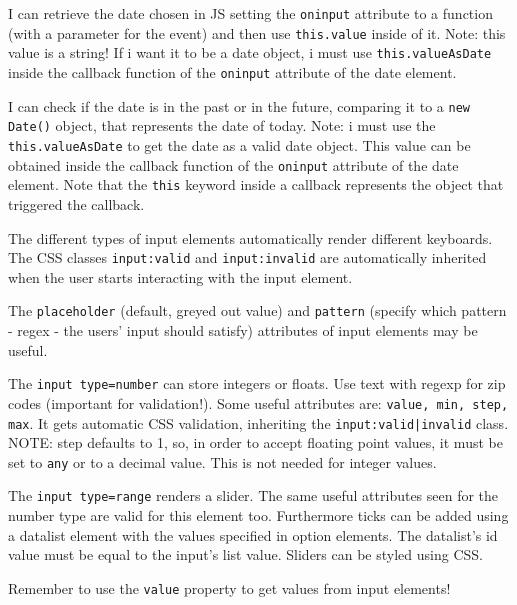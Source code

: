 \documentclass[a4paper,11pt]{book}
\begin{document}
I can retrieve the date chosen in JS setting the \texttt{oninput} attribute to a function
(with a parameter for the event) and then use \texttt{this.value} inside of it. Note:
this value is a string! If i want it to be a date object, i must use
\texttt{this.valueAsDate} inside the callback function of the \texttt{oninput}
attribute of the date element.

I can check if the date is in the past or in the future, comparing it to a
\texttt{new Date()} object, that represents the date of today. Note: i must
use the \texttt{this.valueAsDate} to get the date as a valid date object.
This value can be obtained inside the callback function of the
\texttt{oninput} attribute of the date element.
Note that the \texttt{this} keyword inside a callback represents the object
that triggered the callback.

The different types of input elements automatically render different keyboards.
The CSS classes \texttt{input:valid} and \texttt{input:invalid} are automatically
inherited when the user starts interacting with the input element.

The \texttt{placeholder} (default, greyed out value) and \texttt{pattern}
(specify which pattern - regex - the users' input should satisfy) attributes of
input elements may be useful.

The \texttt{input type=number} can store integers or floats. Use text with regexp
for zip codes (important for validation!). Some useful attributes are:
\texttt{value, min, step, max}. It gets automatic CSS validation, inheriting
the \texttt{input:valid|invalid} class.
NOTE: step defaults to 1, so, in order to accept floating point values, it
must be set to \texttt{any} or to a decimal value. This is not needed for integer
values.

The \texttt{input type=range} renders a slider. The same useful attributes seen
for the number type are valid for this element too. Furthermore ticks can be
added using a datalist element with the values specified in option elements. The
datalist's id value must be equal to the input's list value.
Sliders can be styled using CSS.

Remember to use the \texttt{value} property to get values from input elements!
\end{document}

